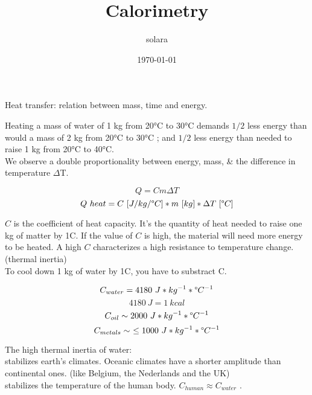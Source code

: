 \documentclass[11pt]{article}
\title{Calorimetry}
\author{solara}
\date{\today}
\begin{document}
  \maketitle

  Heat transfer: relation between mass, time and energy.

  \vspace{1cm}
  Heating a mass of water of 1 kg from 20°C to 30°C demands $1/2$ less energy than would 
  a mass of 2 kg from 20°C to 30°C ; and $1/2$ less energy than needed to raise 1 kg from 20°C to 40°C. \\
  We observe a double proportionality between energy, mass, \& the difference in temperature $\Delta$T.

  $$Q=Cm\Delta T$$
  $$Q\ heat = C\ [J/kg/\degree C] * m\ [kg] * \Delta T\ [\degree C]$$
  \vspace{0cm}

  $C$ is the coefficient of heat capacity. It's the quantity of heat needed to raise one kg of matter by 1\degree C.
  If the value of $C$ is high, the material will need more energy to be heated. A high $C$ characterizes a high
  resistance to temperature change. (thermal inertia) \\
  To cool down 1 kg of water by 1\degree C, you have to substract C.

  $$C_{water} = 4180\ J*kg^{-1}*\degree C^{-1}$$
  $$4180\ J = 1\ kcal$$
  $$C_{oil} \sim 2000\ J*kg^{-1}*\degree C^{-1}$$
  $$C_{metals} \sim\ \leq 1000\ J*kg^{-1}*\degree C^{-1}$$
  \vspace{0cm}

  The high thermal inertia of water: \\
  \ce{->} stabilizes earth's climates. Oceanic climates have a shorter amplitude than continental ones.
  (like Belgium, the Nederlands and the UK) \\
  \ce{->} stabilizes the temperature of the human body. $C_{human} \approx C_{water}$ .
\end{document}
